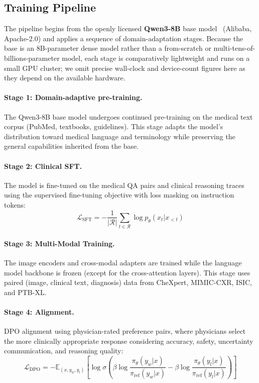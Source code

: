 \documentclass[11pt,a4paper]{article}
\begin{document}
\subsection{Training Pipeline}

The pipeline begins from the openly licensed \textbf{Qwen3-8B} base model~\citep{qwen3} (Alibaba, Apache-2.0) and applies a sequence of domain-adaptation stages. Because the base is an 8B-parameter dense model rather than a from-scratch or multi-tens-of-billions-parameter model, each stage is comparatively lightweight and runs on a small GPU cluster; we omit precise wall-clock and device-count figures here as they depend on the available hardware.

\paragraph{Stage 1: Domain-adaptive pre-training.} The Qwen3-8B base model undergoes continued pre-training on the medical text corpus (PubMed, textbooks, guidelines). This stage adapts the model's distribution toward medical language and terminology while preserving the general capabilities inherited from the base.

\paragraph{Stage 2: Clinical SFT.} The model is fine-tuned on the medical QA pairs and clinical reasoning traces using the supervised fine-tuning objective with loss masking on instruction tokens:
\begin{equation}
    \mathcal{L}_{\text{SFT}} = -\frac{1}{|\mathcal{R}|}\sum_{t \in \mathcal{R}} \log p_\theta(x_t | x_{<t})
\end{equation}

\paragraph{Stage 3: Multi-Modal Training.} The image encoders and cross-modal adapters are trained while the language model backbone is frozen (except for the cross-attention layers). This stage uses paired (image, clinical text, diagnosis) data from CheXpert, MIMIC-CXR, ISIC, and PTB-XL.

\paragraph{Stage 4: Alignment.} DPO alignment using physician-rated preference pairs, where physicians select the more clinically appropriate response considering accuracy, safety, uncertainty communication, and reasoning quality:
\begin{equation}
    \mathcal{L}_{\text{DPO}} = -\mathbb{E}_{(x, y_w, y_l)} \left[\log \sigma\left(\beta \log \frac{\pi_\theta(y_w|x)}{\pi_{\text{ref}}(y_w|x)} - \beta \log \frac{\pi_\theta(y_l|x)}{\pi_{\text{ref}}(y_l|x)}\right)\right]
\end{equation}
\end{document}
